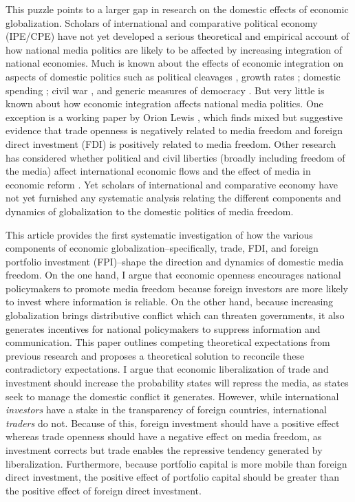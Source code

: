 \documentclass[12pt,a4paper]{article}\usepackage[]{graphicx}\usepackage[]{color}
\begin{document}
This puzzle points to a larger gap in research on the domestic effects of economic globalization. Scholars of international and comparative political economy (IPE/CPE) have not yet developed a serious theoretical and empirical account of how national media politics are likely to be affected by increasing integration of national economies. Much is known about the effects of economic integration on aspects of domestic politics such as political cleavages \parencites{Rogowski:1987ip}{Rogowski:1989wm}{Hiscox:2002us}{hiscox2002international}, growth rates \parencite{Rodriguez:2001uw}; domestic spending \parencites{Rodrik:1998te}{Burgoon:2001dp}; civil war \parencites{Barbieri:2005uk}{Bussmann:2007vx}, and generic measures of democracy \parencites{EICHENGREEN:2008gg}{Li:2003vj}. But very little is known about how economic integration affects national media politics. One exception is a working paper by Orion Lewis \parencite*{Lewis:qDvYbWlU}, which finds mixed but suggestive evidence that trade openness is negatively related to media freedom and foreign direct investment (FDI) is positively related to media freedom. Other research has considered whether political and civil liberties (broadly including freedom of the media) affect international economic flows \parencite{Adam:2007gn} and the effect of media in economic reform \parencites{Coyne:2004bq}{Islam:2002uc}. Yet scholars of international and comparative economy have not yet furnished any systematic analysis relating the different components and dynamics of globalization to the domestic politics of media freedom.

This article provides the first systematic investigation of how the various components of economic globalization--specifically, trade, FDI, and foreign portfolio investment (FPI)--shape the direction and dynamics of domestic media freedom. On the one hand, I argue that economic openness encourages national policymakers to promote media freedom because foreign investors are more likely to invest where information is reliable. On the other hand, because increasing globalization brings distributive conflict which can threaten governments, it also generates incentives for national policymakers to suppress information and communication. This paper outlines competing theoretical expectations from previous research and proposes a theoretical solution to reconcile these contradictory expectations. I argue that economic liberalization of trade and investment should increase the probability states will repress the media, as states seek to manage the domestic conflict it generates. However, while international \emph{investors} have a stake in the transparency of foreign countries, international \emph{traders} do not. Because of this, foreign investment should have a positive effect whereas trade openness should have a negative effect on media freedom, as investment corrects but trade enables the repressive tendency generated by liberalization. Furthermore, because portfolio capital is more mobile than foreign direct investment, the positive effect of portfolio capital should be greater than the positive effect of foreign direct investment.
\end{document}
